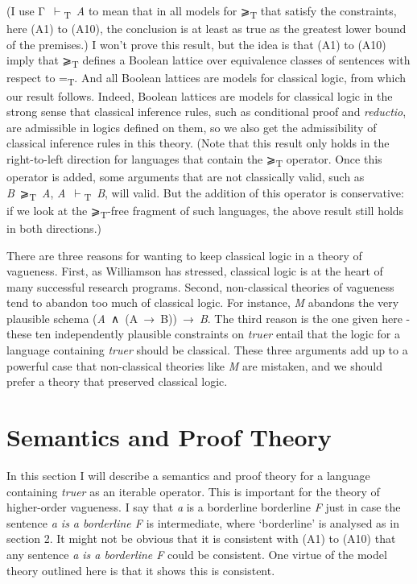 \documentclass[
  11pt,
  letterpaper,
  DIV=11,
  numbers=noendperiod,
  twoside]{scrartcl}
\begin{document}
(I use Γ~\(\vdash\)\textsubscript{T}~\emph{A} to mean that in all models
for ⩾\textsubscript{T} that satisfy the constraints, here (A1) to (A10),
the conclusion is at least as true as the greatest lower bound of the
premises.) I won't prove this result, but the idea is that (A1) to (A10)
imply that ⩾\textsubscript{T} defines a Boolean lattice over equivalence
classes of sentences with respect to =\textsubscript{T}. And all Boolean
lattices are models for classical logic, from which our result follows.
Indeed, Boolean lattices are models for classical logic in the strong
sense that classical inference rules, such as conditional proof and
\emph{reductio}, are admissible in logics defined on them, so we also
get the admissibility of classical inference rules in this theory. (Note
that this result only holds in the right-to-left direction for languages
that contain the ⩾\textsubscript{T} operator. Once this operator is
added, some arguments that are not classically valid, such as
\emph{B}~⩾\textsubscript{T}~\emph{A},
\emph{A}~\(\vdash\)\textsubscript{T}~\emph{B}, will valid. But the
addition of this operator is conservative: if we look at the
⩾\textsubscript{T}-free fragment of such languages, the above result
still holds in both directions.)

There are three reasons for wanting to keep classical logic in a theory
of vagueness. First, as Williamson has stressed, classical logic is at
the heart of many successful research programs. Second, non-classical
theories of vagueness tend to abandon too much of classical logic. For
instance, \emph{M} abandons the very plausible schema
(\emph{A}~∧~(A~→~B))~→~\emph{B}. The third reason is the one given here
- these ten independently plausible constraints on \emph{truer} entail
that the logic for a language containing \emph{truer} should be
classical. These three arguments add up to a powerful case that
non-classical theories like \emph{M} are mistaken, and we should prefer
a theory that preserved classical logic.

\section{Semantics and Proof Theory}\label{semantics-and-proof-theory}

In this section I will describe a semantics and proof theory for a
language containing \emph{truer} as an iterable operator. This is
important for the theory of higher-order vagueness. I say that \emph{a}
is a borderline borderline \emph{F} just in case the sentence \emph{a is
a borderline F} is intermediate, where `borderline' is analysed as in
section 2. It might not be obvious that it is consistent with (A1) to
(A10) that any sentence \emph{a is a borderline F} could be consistent.
One virtue of the model theory outlined here is that it shows this is
consistent.
\end{document}
